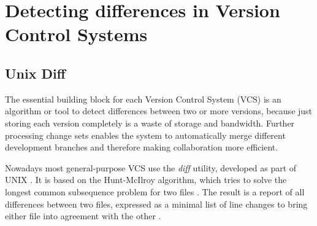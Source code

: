 \section[Detecting differences in Version Control Systems (VCS)]{Detecting differences in Version Control Systems}
	\label{sec:background:diff}
	
	\subsection{Unix Diff}
	\label{sec:background:diff:unix-diff}
	The essential building block for each Version Control System (VCS) is an algorithm or tool to detect differences between two or more versions, because just storing each version completely is a waste of storage and bandwidth. Further processing change sets enables the system to automatically merge different development branches and therefore making collaboration more efficient.
	
	Nowadays most general-purpose VCS use the \emph{diff} utility, developed as part of UNIX \citep{Chacon2014,OSullivan2009,Collins-Sussman2004}. It is based on the Hunt-McIlroy algorithm, which tries to solve the longest common subsequence problem for two files \citep{Hunt1976}.
	The result is a report of all differences between two files, expressed as a minimal list of line changes to bring either file into agreement with the other \citep{Hunt1976}.
	

	
